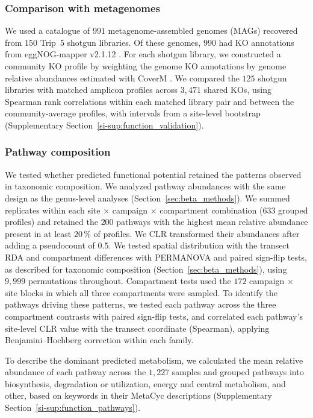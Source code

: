 \documentclass[fleqn,10pt,numbers]{olplainarticle}
\begin{document}
\subsubsection*{Comparison with metagenomes}\label{sec:function_metagenomes}
We used a catalogue of $991$ metagenome-assembled genomes (MAGs) recovered from $150$ Trip~$5$ shotgun libraries. Of these genomes, $990$ had KO annotations from eggNOG-mapper v2.1.12 \cite{cantalapiedra2021eggnog}. For each shotgun library, we constructed a community KO profile by weighting the genome KO annotations by genome relative abundances estimated with CoverM \cite{aroney2025coverm}. We compared the $125$ shotgun libraries with matched amplicon profiles across $3{,}471$ shared KOs, using Spearman rank correlations within each matched library pair and between the community-average profiles, with intervals from a site-level bootstrap (Supplementary Section~\ref{si-sup:function_validation}).

\subsubsection*{Pathway composition}\label{sec:function_pathways}
We tested whether predicted functional potential retained the patterns observed in taxonomic composition. We analyzed pathway abundances with the same design as the genus-level analyses (Section~\ref{sec:beta_methods}). We summed replicates within each site $\times$ campaign $\times$ compartment combination ($633$ grouped profiles) and retained the $200$ pathways with the highest mean relative abundance present in at least $20\,\%$ of profiles. We CLR transformed their abundances after adding a pseudocount of $0.5$. We tested spatial distribution with the transect RDA and compartment differences with PERMANOVA and paired sign-flip tests, as described for taxonomic composition (Section~\ref{sec:beta_methods}), using $9{,}999$ permutations throughout. Compartment tests used the $172$ campaign $\times$ site blocks in which all three compartments were sampled. To identify the pathways driving these patterns, we tested each pathway across the three compartment contrasts with paired sign-flip tests, and correlated each pathway's site-level CLR value with the transect coordinate (Spearman), applying Benjamini--Hochberg correction within each family.

To describe the dominant predicted metabolism, we calculated the mean relative abundance of each pathway across the $1{,}227$ samples and grouped pathways into biosynthesis, degradation or utilization, energy and central metabolism, and other, based on keywords in their MetaCyc descriptions (Supplementary Section~\ref{si-sup:function_pathways}).
\end{document}
